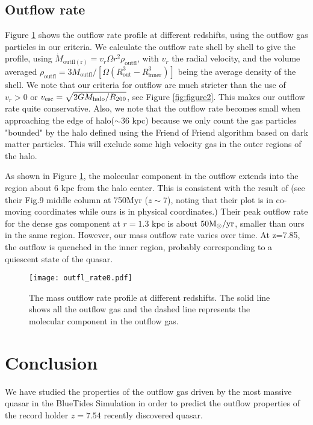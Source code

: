 \documentclass[a4paper,usenatbib]{mnras}
\begin{document}
\subsection{Outflow rate}
Figure \ref{fig:figure7} shows the outflow rate profile at different redshifts, using the outflow gas particles in our criteria. We calculate the outflow rate shell by shell to give the profile, using $\dot{M}_\mathrm{{outfl}(r)}=v_r\Omega r^2 \rho_{\mathrm{outfl}}$, with $v_r$ the radial velocity, and the volume averaged $\rho_{\mathrm{outfl}}=3M_{\mathrm{outfl}}/[\Omega(R^3_\mathrm{{out}}-R^3_\mathrm{{inner}})]$ being the average density of the shell. We note that our criteria for outflow are much stricter than the use of $v_r >0$ or $v_{\rm esc}=\sqrt{2GM_{\rm halo}/R_{200}}$, see Figure \ref{fig:figure2}. This makes our outflow rate quite conservative. 
Also, we note that the outflow rate becomes small when approaching  the edge of halo($\sim 36$ kpc) because we only count the gas particles "bounded" by the halo defined using the Friend of Friend algorithm based on dark matter particles. This will exclude some high velocity gas in the outer regions of the halo.

As shown in Figure \ref{fig:figure7}, the molecular component in the outflow extends into the region about 6 kpc from the halo center. This is consistent with the result of \cite{Biernacki} (see their Fig.9 middle column at 750Myr ($z\sim7$), noting that their plot is in co-moving coordinates while ours is in physical coordinates.) Their peak outflow rate for the dense gas component at $r=1.3$ kpc is about $50 \rm {M}_\odot/yr$, smaller than ours in the same region. However, our mass outflow rate varies over time. At z=7.85, the outflow is quenched in the inner region, probably corresponding to a quiescent state of the quasar.



\begin{figure}
\texttt{[image: outfl\_rate0.pdf]}
    \caption{The mass outflow rate profile at different redshifts. The solid line shows all the outflow gas and the dashed line represents the molecular component in the outflow gas.}
    \label{fig:figure7}
\end{figure}

\section{Conclusion}
We have studied the properties of the outflow gas driven by the most massive quasar in the BlueTides Simulation
in order to predict the outflow properties of the record holder $z=7.54$ recently discovered quasar. 
\end{document}

